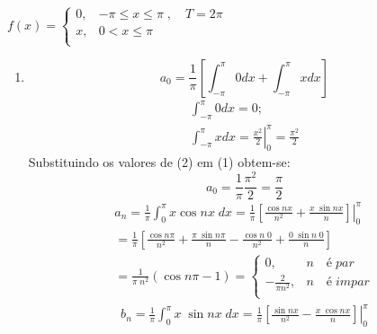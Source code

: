 \documentclass[12pt]{article}
\newcommand*\Eval[3]{\left.#1\right\rvert_{#2}^{#3}}
\begin{document}
\section{}
$
    f(x) = 
    \begin{cases}
    0 , & -\pi \le x \le \pi \;,\quad T=2\pi\\
    x , & 0 < x\le \pi\\
    \end{cases}
$
\begin{enumerate}[label=S.]
    \item
    \begin{equation}
    a_{0} = \frac{1}{\pi} \left[ \int_{-\pi}^{\pi} 0 dx + \int_{-\pi}^{\pi} x dx \right]
    \end{equation}
    \begin{equation}
    \begin{split}
    \int_{-\pi}^{\pi} 0 dx = 0;\\
    \int_{-\pi}^{\pi} x dx = \Eval{\frac{x^{2}}{2}}{0}{\pi} = \frac{\pi^{2}}{2}
    \end{split}
    \end{equation}
    Substituindo os valores de (2) em (1) obtem-se:
    \begin{equation}
    a_{0} = \frac{1}{\pi} \frac{\pi^{2}}{2} = \frac{\pi}{2}
    \end{equation}
    \begin{equation}
    \begin{split}
    a_{n} = \frac{1}{\pi} \int_{0}^{\pi} x \cos nx \; dx = \frac{1}{\pi} \Eval{\left[\frac{\cos nx}{n^2} + \frac{x\; \sin nx}{n}\right]}{0}{\pi} \\= \frac{1}{\pi} \left[\frac{\cos n\pi}{n^2} + \frac{\pi\; \sin n\pi}{n} - \frac{\cos n\;0}{n^2} + \frac{0\; \sin n\;0}{n}\right]\\
    =\frac{1}{\pi\;n^{2}}(\cos n\pi -1) = 
    \begin{cases}
    0 , & n \quad é\;  par\\
    -\frac{2}{\pi n^{2}} , & n \quad é\;  impar\\
    \end{cases}
    \end{split}
    \end{equation}
    \begin{equation}\begin{split}
    b_{n} = \frac{1}{\pi} \int_{0}^{\pi} x\; \sin nx\; dx = \frac{1}{\pi} \Eval{\left[\frac{\sin nx}{n^{2}} - \frac{x\; \cos nx}{n}\right]}{0}{\pi}\\

\end{split}
\end{equation}
\end{enumerate}
\end{document}
